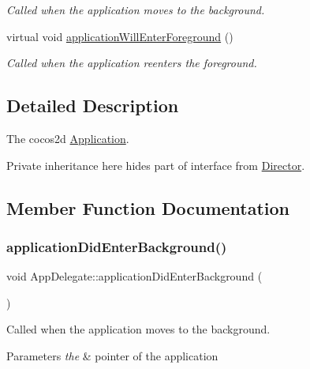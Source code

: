 \begin{DoxyCompactItemize}
\begin{DoxyCompactList}\small\item\em Called when the application moves to the background. \end{DoxyCompactList}\item 
virtual void \hyperlink{classAppDelegate_a3d566ef257a887953201bf8fe44de8a4}{application\+Will\+Enter\+Foreground} ()
\begin{DoxyCompactList}\small\item\em Called when the application reenters the foreground. \end{DoxyCompactList}\end{DoxyCompactItemize}


\subsection{Detailed Description}
The cocos2d \hyperlink{classApplication}{Application}. 

Private inheritance here hides part of interface from \hyperlink{classDirector}{Director}. 

\subsection{Member Function Documentation}
\mbox{\label{classAppDelegate_a17cb09777419781698324e0415bffd3a}} 
\subsubsection{\texorpdfstring{application\+Did\+Enter\+Background()}{applicationDidEnterBackground()}\hspace{0.1cm}{\footnotesize\ttfamily [1/4]}}
{\footnotesize\ttfamily void App\+Delegate\+::application\+Did\+Enter\+Background (\begin{DoxyParamCaption}{ }\end{DoxyParamCaption})\hspace{0.3cm}{\ttfamily [virtual]}}



Called when the application moves to the background. 


\begin{DoxyParams}{Parameters}
{\em the} & pointer of the application \\
\hline
\end{DoxyParams}
\mbox{\label{classAppDelegate_a852ad7535f0df46885c2a36d3f17a0e8}} 
